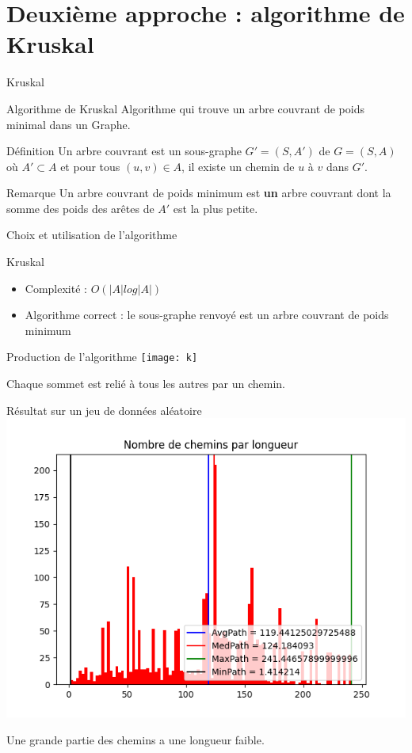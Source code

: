 \documentclass[aspectratio=43,11pt]{beamer}
\begin{document}
\section{Deuxième approche : algorithme de Kruskal}
\begin{frame}{Kruskal}
    \begin{block}{Algorithme de Kruskal}
        Algorithme qui trouve un arbre couvrant de poids minimal dans un Graphe.
    \end{block}
    \begin{block}{Définition}
        Un arbre couvrant est un sous-graphe $G'=(S, A')$ de $G=(S, A)$ où $A' \subset A$ et pour tous $(u, v) \in A$, il existe un chemin de $u$ à $v$ dans $G'$.
    \end{block}
    \begin{exampleblock}{Remarque}
        Un arbre couvrant de poids minimum est \textbf{un} arbre couvrant dont la somme des poids des arêtes de $A'$ est la plus petite.
    \end{exampleblock}
\end{frame}
\begin{frame}{Choix et utilisation de l'algorithme}
\end{frame}
\begin{frame}{Kruskal}
    \begin{itemize}
        \item Complexité : $O(|A| log |A|)$
        \item Algorithme correct : le sous-graphe renvoyé est un arbre couvrant de poids minimum
    \end{itemize}
\end{frame}
\begin{frame}{Production de l'algorithme}
    \centering
        \texttt{[image: k]}

    Chaque sommet est relié à tous les autres par un chemin.
\end{frame}
\begin{frame}{Résultat sur un jeu de données aléatoire}
    \centering
        \includegraphics[height=0.8\textheight]{k_r}

    Une grande partie des chemins a une longueur faible.
\end{frame}
\end{document}
